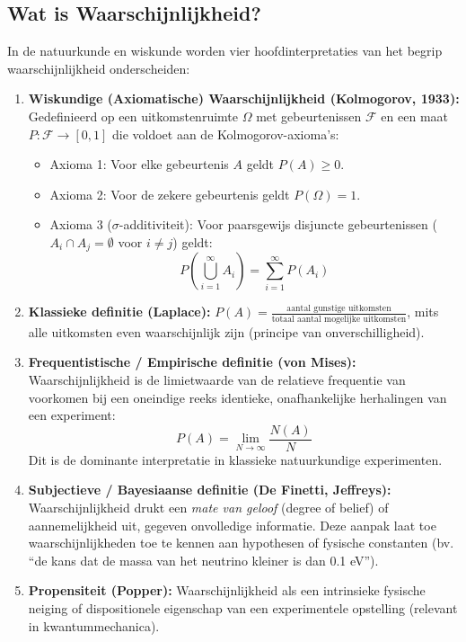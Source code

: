 \documentclass[11pt,a4paper]{article}
\begin{document}
\subsection{Wat is Waarschijnlijkheid?}
In de natuurkunde en wiskunde worden vier hoofdinterpretaties van het begrip waarschijnlijkheid onderscheiden:
\begin{enumerate}[leftmargin=1.5em]
    \item \textbf{Wiskundige (Axiomatische) Waarschijnlijkheid (Kolmogorov, 1933):}
    Gedefinieerd op een uitkomstenruimte $\Omega$ met gebeurtenissen $\mathcal{F}$ en een maat $P: \mathcal{F} \to [0,1]$ die voldoet aan de Kolmogorov-axioma's:
    \begin{itemize}
        \item Axioma 1: Voor elke gebeurtenis $A$ geldt $P(A) \ge 0$.
        \item Axioma 2: Voor de zekere gebeurtenis geldt $P(\Omega) = 1$.
        \item Axioma 3 ($\sigma$-additiviteit): Voor paarsgewijs disjuncte gebeurtenissen ($A_i \cap A_j = \emptyset$ voor $i \neq j$) geldt:
        \begin{equation}
            P\left(\bigcup_{i=1}^\infty A_i\right) = \sum_{i=1}^\infty P(A_i)
        \end{equation}
    \end{itemize}
    \item \textbf{Klassieke definitie (Laplace):}
    $P(A) = \frac{\text{aantal gunstige uitkomsten}}{\text{totaal aantal mogelijke uitkomsten}}$, mits alle uitkomsten even waarschijnlijk zijn (principe van onverschilligheid).
    \item \textbf{Frequentistische / Empirische definitie (von Mises):}
    Waarschijnlijkheid is de limietwaarde van de relatieve frequentie van voorkomen bij een oneindige reeks identieke, onafhankelijke herhalingen van een experiment:
    \begin{equation}
        P(A) = \lim_{N \to \infty} \frac{N(A)}{N}
    \end{equation}
    Dit is de dominante interpretatie in klassieke natuurkundige experimenten.
    \item \textbf{Subjectieve / Bayesiaanse definitie (De Finetti, Jeffreys):}
    Waarschijnlijkheid drukt een \emph{mate van geloof} (degree of belief) of aannemelijkheid uit, gegeven onvolledige informatie. Deze aanpak laat toe waarschijnlijkheden toe te kennen aan hypothesen of fysische constanten (bv. ``de kans dat de massa van het neutrino kleiner is dan 0.1 eV'').
    \item \textbf{Propensiteit (Popper):}
    Waarschijnlijkheid als een intrinsieke fysische neiging of dispositionele eigenschap van een experimentele opstelling (relevant in kwantummechanica).
\end{enumerate}
\end{document}
